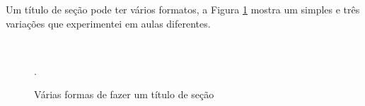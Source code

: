 Um título de seção pode ter vários formatos, a Figura \ref{fig:sectitles} mostra um simples e três variações que experimentei em aulas diferentes.

\begin{figure}
    \centering
    \\
\caption{Várias formas de fazer um título de seção}.
\label{fig:sectitles}
\end{figure}


